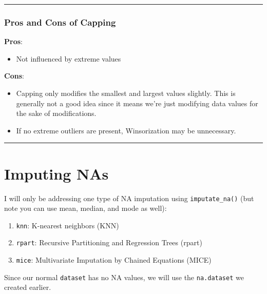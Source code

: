 \documentclass[
  letterpaper,
  DIV=11,
  numbers=noendperiod]{scrreprt}
\providecommand{\tightlist}{%
  \setlength{\itemsep}{0pt}\setlength{\parskip}{0pt}}\usepackage{longtable,booktabs,array}
\begin{document}
\begin{center}\rule{0.5\linewidth}{0.5pt}\end{center}

\hypertarget{pros-and-cons-of-capping}{%
\subsubsection{Pros and Cons of
Capping}\label{pros-and-cons-of-capping}}

\textbf{Pros}:

\begin{itemize}
\tightlist
\item
  Not influenced by extreme values
\end{itemize}

\textbf{Cons}:

\begin{itemize}
\item
  Capping only modifies the smallest and largest values slightly. This
  is generally not a good idea since it means we're just modifying data
  values for the sake of modifications.
\item
  If no extreme outliers are present, Winsorization may be unnecessary.
\end{itemize}

\begin{center}\rule{0.5\linewidth}{0.5pt}\end{center}

\hypertarget{imputing-nas}{%
\section{Imputing NAs}\label{imputing-nas}}

I will only be addressing one type of NA imputation using
\texttt{imputate\_na()} (but note you can use mean, median, and mode as
well):

\begin{enumerate}
\def\labelenumi{\arabic{enumi}.}
\tightlist
\item
  \texttt{knn}: K-nearest neighbors (KNN)
\item
  \texttt{rpart}: Recursive Partitioning and Regression Trees (rpart)
\item
  \texttt{mice}: Multivariate Imputation by Chained Equations (MICE)
\end{enumerate}

Since our normal \texttt{dataset} has no NA values, we will use the
\texttt{na.dataset} we created earlier.
\end{document}
